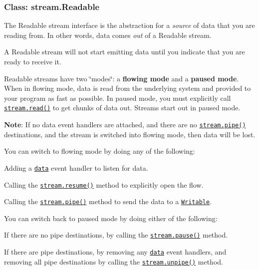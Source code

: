 \subsubsection*{Class\+: stream.\+Readable}

The Readable stream interface is the abstraction for a {\itshape source} of data that you are reading from. In other words, data comes {\itshape out} of a Readable stream.

A Readable stream will not start emitting data until you indicate that you are ready to receive it.

Readable streams have two \char`\"{}modes\char`\"{}\+: a {\bfseries flowing mode} and a {\bfseries paused mode}. When in flowing mode, data is read from the underlying system and provided to your program as fast as possible. In paused mode, you must explicitly call \href{#stream_readable_read_size}{\tt {\ttfamily stream.\+read()}} to get chunks of data out. Streams start out in paused mode.

{\bfseries Note}\+: If no data event handlers are attached, and there are no \href{#stream_readable_pipe_destination_options}{\tt {\ttfamily stream.\+pipe()}} destinations, and the stream is switched into flowing mode, then data will be lost.

You can switch to flowing mode by doing any of the following\+:


\begin{DoxyItemize}
\item Adding a \href{#stream_event_data}{\tt {\ttfamily \textquotesingle{}data\textquotesingle{}}} event handler to listen for data.
\item Calling the \href{#stream_readable_resume}{\tt {\ttfamily stream.\+resume()}} method to explicitly open the flow.
\item Calling the \href{#stream_readable_pipe_destination_options}{\tt {\ttfamily stream.\+pipe()}} method to send the data to a \href{#stream_class_stream_writable}{\tt Writable}.
\end{DoxyItemize}

You can switch back to paused mode by doing either of the following\+:


\begin{DoxyItemize}
\item If there are no pipe destinations, by calling the \href{#stream_readable_pause}{\tt {\ttfamily stream.\+pause()}} method.
\item If there are pipe destinations, by removing any \href{#stream_event_data}{\tt {\ttfamily \textquotesingle{}data\textquotesingle{}}} event handlers, and removing all pipe destinations by calling the \href{#stream_readable_unpipe_destination}{\tt {\ttfamily stream.\+unpipe()}} method.
\end{DoxyItemize}

